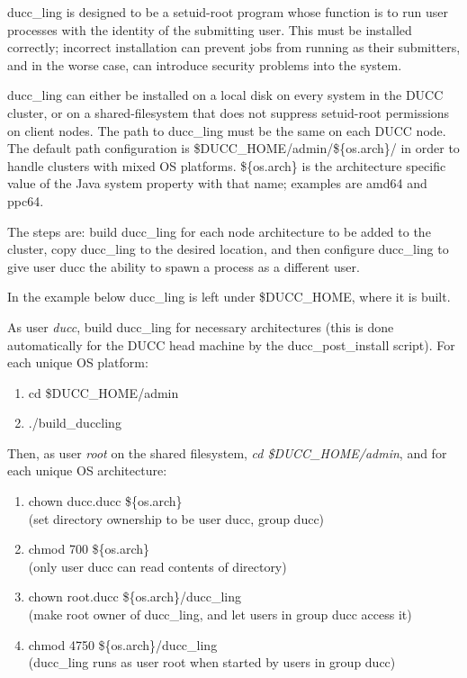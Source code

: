     ducc\_ling is designed to be a setuid-root program whose function is to run user processes with the identity of
    the submitting user. This must be installed correctly; incorrect installation can prevent jobs from running as
    their submitters, and in the worse case, can introduce security problems into the system.

    ducc\_ling can either be installed on a local disk on every system in the DUCC cluster, 
    or on a shared-filesystem that does not suppress setuid-root permissions on client nodes.
    The path to ducc\_ling must be the same on each DUCC node. 
    The default path configuration is
    \${DUCC\_HOME}/admin/\$\{os.arch\}/ in order to handle clusters with mixed OS platforms.
    \$\{os.arch\} is the architecture specific value of the Java system property with that name;
    examples are amd64 and ppc64.
   
	The steps are: build ducc\_ling for each node architecture to be added to the cluster,
	copy ducc\_ling to the desired location, and then configure ducc\_ling to give user
	ducc the ability to spawn a process as a different user.

    In the example below ducc\_ling is left under \$DUCC\_HOME, where it is built.

    As user {\em ducc}, build ducc\_ling for necessary architectures (this is done
    automatically for the DUCC head machine by the ducc\_post\_install script).
    For each unique OS platform:
    \begin{enumerate}
        \item cd \$DUCC\_HOME/admin
        \item ./build\_duccling
     \end{enumerate}

     Then, as user {\em root} on the shared filesystem, {\em cd \$DUCC\_HOME/admin}, and for each unique OS architecture:
     \begin{enumerate}
        \item chown ducc.ducc \$\{os.arch\}
        \\ (set directory ownership to be user ducc, group ducc)
        \item chmod 700 \$\{os.arch\}
        \\ (only user ducc can read contents of directory)
        \item chown root.ducc \$\{os.arch\}/ducc\_ling
        \\ (make root owner of ducc\_ling, and let users in group ducc access it)
        \item chmod 4750 \$\{os.arch\}/ducc\_ling
        \\ (ducc\_ling runs as user root when started by users in group ducc)
     \end{enumerate}
          
